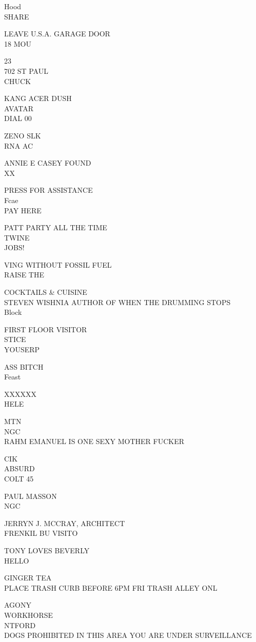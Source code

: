 \documentclass[10pt,letterpaper]{article}
\begin{document}
Hood\\
SHARE

LEAVE U.S.A. GARAGE DOOR\\
18 MOU

23\\
702 ST PAUL\\
CHUCK

KANG ACER DUSH\\
AVATAR\\
DIAL 00

ZENO SLK\\
RNA AC

ANNIE E CASEY FOUND\\
XX

PRESS FOR ASSISTANCE\\
Fcae\\
PAY HERE

PATT PARTY ALL THE TIME\\
TWINE\\
JOBS!

VING WITHOUT FOSSIL FUEL\\
RAISE THE

COCKTAILS \& CUISINE\\
STEVEN WISHNIA AUTHOR OF WHEN THE DRUMMING STOPS\\
Block

FIRST FLOOR VISITOR\\
STICE\\
YOUSERP

ASS BITCH\\
Feast

XXXXXX\\
HELE

MTN\\
NGC\\
RAHM EMANUEL IS ONE SEXY MOTHER FUCKER

CIK\\
ABSURD\\
COLT 45

PAUL MASSON\\
NGC

JERRYN J. MCCRAY, ARCHITECT\\
FRENKIL BU VISITO

TONY LOVES BEVERLY\\
HELLO

GINGER TEA\\
PLACE TRASH CURB BEFORE 6PM FRI TRASH ALLEY ONL

AGONY\\
WORKHORSE\\
NTFORD\\
DOGS PROHIBITED IN THIS AREA YOU ARE UNDER SURVEILLANCE
\end{document}
